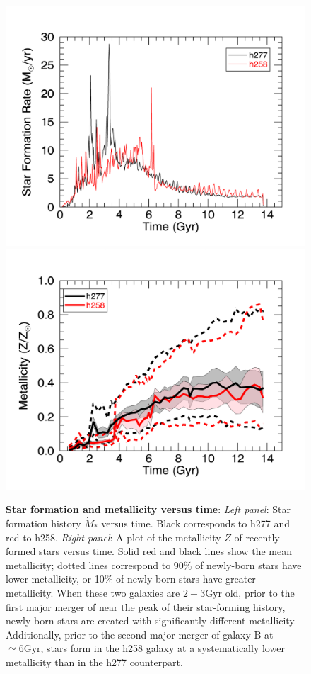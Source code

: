 \documentclass[a4paper,fleqn,usenatbib]{mnras}
\newcommand\unit[1]{\text{#1}}
\newcommand\ExcitingGalaxy{h258}
\newcommand\BoringGalaxy{h277}
\begin{document}
\begin{figure}
\includegraphics[width=\columnwidth]{Figures/sfh}
\includegraphics[width=\columnwidth]{Figures/zvst}
\caption{\label{fig:TwoGalaxies}\textbf{Star formation and metallicity versus time}:  \emph{Left panel}: Star formation history $\dot{M}_{*}$
  versus time.  Black corresponds to \BoringGalaxy{} and red to \ExcitingGalaxy.  
\emph{Right panel}: A plot of the  metallicity $Z$ of recently-formed stars versus time.  Solid red and black lines show
the mean metallicity; dotted lines correspond to  90\% of newly-born stars have lower metallicity,   or 10\% of
newly-born stars have greater metallicity.  When these two galaxies are $2-3\unit{Gyr}$ old, prior to the first major
merger of  near the peak of their
star-forming history, newly-born stars are created with significantly different metallicity.  Additionally, prior to the
second major merger of galaxy B at $\simeq 6\unit{Gyr}$, stars form in the \ExcitingGalaxy{} galaxy at a systematically lower
metallicity than in the \BoringGalaxy{} counterpart.
}
\end{figure}
\end{document}
